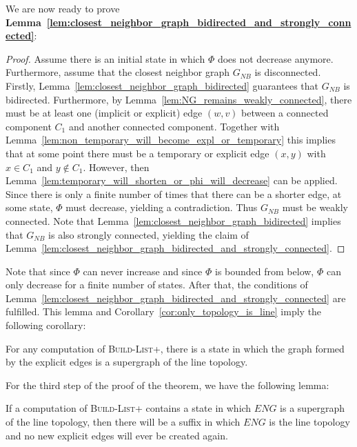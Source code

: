 \documentclass[a4paper,USenglish]{lipics}
\newcommand{\blp}{\textsc{Build-List+}\xspace}
\begin{document}
We are now ready to prove \textbf{Lemma~\ref{lem:closest_neighbor_graph_bidirected_and_strongly_connected}}:
\begin{proof}
  Assume there is an initial state in which $\Phi$ does not decrease anymore.
  Furthermore, assume that the closest neighbor graph $G_{NB}$ is disconnected.
  Firstly, Lemma~\ref{lem:closest_neighbor_graph_bidirected} guarantees that $G_{NB}$ is bidirected.
  Furthermore, by Lemma~\ref{lem:NG_remains_weakly_connected}, there must be at least one (implicit or explicit) edge $(w,v)$ between a connected component $C_1$ and another connected component.
  Together with Lemma~\ref{lem:non_temporary_will_become_expl_or_temporary} this implies that at some point there must be a temporary or explicit edge $(x,y)$ with $x \in C_1$ and $y \notin C_1$.
  However, then Lemma~\ref{lem:temporary_will_shorten_or_phi_will_decrease} can be applied.
  Since there is only a finite number of times that there can be a shorter edge, at some state, $\Phi$ must decrease, yielding a contradiction.
  Thus $G_{NB}$ must be weakly connected.
  Note that Lemma~\ref{lem:closest_neighbor_graph_bidirected} implies that $G_{NB}$ is also strongly connected, yielding the claim of Lemma~\ref{lem:closest_neighbor_graph_bidirected_and_strongly_connected}.
\end{proof}
Note that since $\Phi$ can never increase and since $\Phi$ is bounded from below, $\Phi$ can only decrease for a finite number of states.
After that, the conditions of Lemma~\ref{lem:closest_neighbor_graph_bidirected_and_strongly_connected} are fulfilled.
This lemma and Corollary~\ref{cor:only_topology_is_line} imply the following corollary:
\begin{corollary}\label{cor:explicit_edge_graph_will_become_supergraph}
 For any computation of \blp, there is a state in which the graph formed by the explicit edges is a supergraph of the line topology.
\end{corollary}
For the third step of the proof of the theorem, we have the following lemma:
\begin{lemma}\label{lem:superfluous_edges_will_vanish}         
 If a computation of \blp contains a state in which $ENG$ is a supergraph of the line topology, then there will be a suffix in which $ENG$ is the line topology and no new explicit edges will ever be created again.
\end{lemma}
\end{document}
